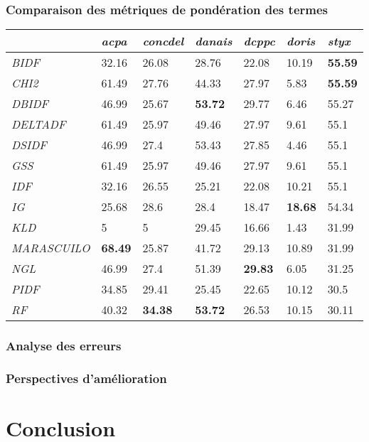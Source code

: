 \subsubsection{Comparaison des métriques de pondération des termes}
\begin{table}[]
	\begin{tabular}{|l|l|l|l|l|l|l|}
		\hline
		& \textit{acpa}  & \textit{concdel} & \textit{danais} & \textit{dcppc} & \textit{doris} & \textit{styx}  \\ \hline
		\textit{BIDF}       & 32.16          & 26.08            & 28.76           & 22.08          & 10.19          & \textbf{55.59} \\ \hline
		\textit{CHI2}       & 61.49          & 27.76            & 44.33           & 27.97          & 5.83           & \textbf{55.59} \\ \hline
		\textit{DBIDF}      & 46.99          & 25.67            & \textbf{53.72}  & 29.77          & 6.46           & 55.27          \\ \hline
		\textit{DELTADF}    & 61.49          & 25.97            & 49.46           & 27.97          & 9.61           & 55.1           \\ \hline
		\textit{DSIDF}      & 46.99          & 27.4             & 53.43           & 27.85          & 4.46           & 55.1           \\ \hline
		\textit{GSS}        & 61.49          & 25.97            & 49.46           & 27.97          & 9.61           & 55.1           \\ \hline
		\textit{IDF}        & 32.16          & 26.55            & 25.21           & 22.08          & 10.21          & 55.1           \\ \hline
		\textit{IG}         & 25.68          & 28.6             & 28.4            & 18.47          & \textbf{18.68} & 54.34          \\ \hline
		\textit{KLD}        & 5              & 5                & 29.45           & 16.66          & 1.43           & 31.99          \\ \hline
		\textit{MARASCUILO} & \textbf{68.49} & 25.87            & 41.72           & 29.13          & 10.89          & 31.99          \\ \hline
		\textit{NGL}        & 46.99          & 27.4             & 51.39           & \textbf{29.83} & 6.05           & 31.25          \\ \hline
		\textit{PIDF}       & 34.85          & 29.41            & 25.45           & 22.65          & 10.12          & 30.5           \\ \hline
		\textit{RF}         & 40.32          & \textbf{34.38}   & \textbf{53.72}  & 26.53          & 10.15          & 30.11          \\ \hline
	\end{tabular}
\end{table}
\subsubsection{Analyse des erreurs}
\subsubsection{Perspectives d'amélioration}

\section{Conclusion}
\label{sec:quanta:conclusion}

